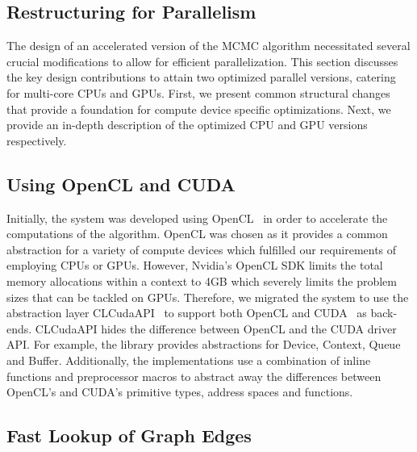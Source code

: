\subsection{Restructuring for Parallelism}

The design of an accelerated version of the MCMC algorithm necessitated several
crucial modifications to allow for efficient parallelization. This section
discusses the key design contributions to attain two optimized
parallel versions, catering for multi-core CPUs and GPUs. First, we present
common structural changes that provide a foundation for compute device specific
optimizations. Next, we provide an in-depth description of the optimized CPU
and GPU versions respectively.

\subsection*{Using OpenCL and CUDA}
Initially, the system was developed using OpenCL~\cite{opencl} in order to
accelerate the computations of the algorithm. OpenCL was chosen as it provides
a common abstraction for a variety of compute devices which fulfilled our
requirements of employing CPUs or GPUs. However, Nvidia's OpenCL SDK limits the
total memory allocations within a context to 4GB which severely limits the
problem sizes that can be tackled on GPUs. Therefore, we migrated the system to
use the abstraction layer CLCudaAPI~\cite{claduc}
to support both OpenCL and CUDA~\cite{Nickolls:2008:SPP:1365490.1365500}
as back-ends.
%
CLCudaAPI
hides the difference between OpenCL and the CUDA driver API.
For example, the library provides abstractions for Device, Context, Queue and
Buffer. Additionally, the implementations use a combination of inline functions
and preprocessor macros to abstract away the differences between OpenCL's and
CUDA's primitive types, address spaces and functions.

\subsection*{Fast Lookup of Graph Edges}

